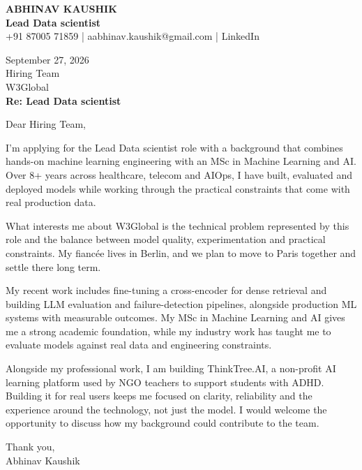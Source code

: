 \documentclass[10pt,a4paper]{article}
\begin{document}
\begin{center}
{\Large\bfseries ABHINAV KAUSHIK}\\[2pt]
{\bfseries Lead Data scientist}\\[2pt]
+91 87005 71859 \quad | \quad aabhinav.kaushik@gmail.com \quad | \quad LinkedIn
\end{center}
\vspace{8pt}
September 27, 2026\\[6pt]
Hiring Team\\
W3Global\\[4pt]
\textbf{Re: Lead Data scientist}

Dear Hiring Team,

I’m applying for the Lead Data scientist role with a background that combines hands-on machine learning engineering with an MSc in Machine Learning and AI. Over 8+ years across healthcare, telecom and AIOps, I have built, evaluated and deployed models while working through the practical constraints that come with real production data.

What interests me about W3Global is the technical problem represented by this role and the balance between model quality, experimentation and practical constraints. My fiancée lives in Berlin, and we plan to move to Paris together and settle there long term.

My recent work includes fine-tuning a cross-encoder for dense retrieval and building LLM evaluation and failure-detection pipelines, alongside production ML systems with measurable outcomes. My MSc in Machine Learning and AI gives me a strong academic foundation, while my industry work has taught me to evaluate models against real data and engineering constraints.

Alongside my professional work, I am building ThinkTree.AI, a non-profit AI learning platform used by NGO teachers to support students with ADHD. Building it for real users keeps me focused on clarity, reliability and the experience around the technology, not just the model. I would welcome the opportunity to discuss how my background could contribute to the team.

Thank you,\\
Abhinav Kaushik
\end{document}
